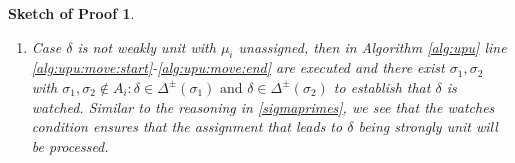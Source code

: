 \documentclass{vutinfth} %
\newcommand{\todo}[1]{{\color{red}\textbf{TODO: {#1}}}} %
\newtheorem{proof-sketch}{Sketch of Proof}[chapter]
\newcommand{\negstrong}[1]{\overline{#1}^s}
\newcommand{\negweak}[1]{\overline{#1}^w}
\newcommand{\ass}{A}
\newcommand{\bT}{\mathbf{T}}
\newcommand{\bF}{\mathbf{F}}
\newcommand{\cdal}{C_\alpha}
\newcommand{\dpm}{\Delta^\pm}
\newcommand{\dal}{\Delta^\alpha}
\newcommand{\headf}{H}
\newcommand{\bodyf}{B}
\newcommand{\sgl}{\mu}
\newcommand{\bsgl}{\sigma}
\begin{document}
\begin{proof-sketch}
\begin{enumerate}
\begin{enumerate}
\begin{enumerate}
\begin{enumerate}
\begin{itemize}
	\end{itemize}
	
	\item Case $\delta$ is not weakly unit with $\sgl_i$ unassigned, then in Algorithm \ref{alg:upu} line \ref{alg:upu:move:start}-\ref{alg:upu:move:end} are executed and there exist $\bsgl_1, \bsgl_2$ with $\bsgl_1, \bsgl_2 \not \in \ass_i : \delta \in \dpm(\bsgl_1) \text{ and } \delta \in \dpm(\bsgl_2)$ to establish that $\delta$ is watched. Similar to the reasoning in \ref{sigmaprimes}, we see that the watches condition ensures that the assignment that leads to $\delta$ being strongly unit will be processed.%
	
	\end{enumerate}
	
		
		
			
			
			
			



\end{enumerate}
\end{enumerate}
\end{enumerate}
\end{proof-sketch}
\end{document}
